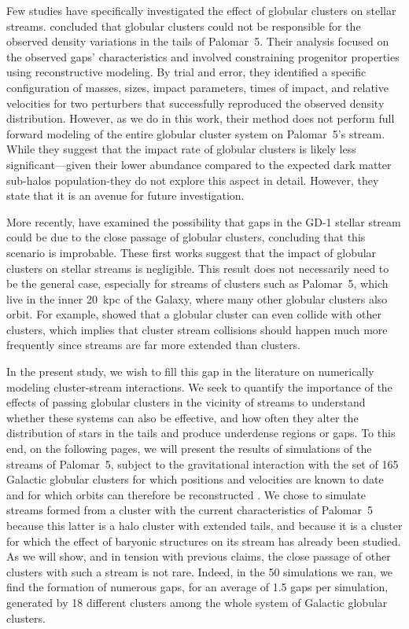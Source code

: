 \documentclass{aa}
\begin{document}
  Few studies have specifically investigated the effect of globular clusters on stellar streams. \citet{2017MNRAS.470...60E} concluded that globular clusters could not be responsible for the observed density variations in the tails of Palomar~5. Their analysis focused on the observed gaps' characteristics and involved constraining progenitor properties using reconstructive modeling. By trial and error, they identified a specific configuration of masses, sizes, impact parameters, times of impact, and relative velocities for two perturbers that successfully reproduced the observed density distribution. However, as we do in this work, their method does not perform full forward modeling of the entire globular cluster system on Palomar~5's stream. While they suggest that the impact rate of globular clusters is likely less significant—given their lower abundance compared to the expected dark matter sub-halos population-they do not explore this aspect in detail. However, they state that it is an avenue for future investigation. 
  
  More recently, \citet{2022ApJ...941..129D} have examined the possibility that gaps in the GD-1 stellar stream could be due to the close passage of globular clusters, concluding that this scenario is improbable. These first works suggest that the impact of globular clusters on stellar streams is negligible. This result does not necessarily need to be the general case, especially for streams of clusters such as Palomar~5, which live in the inner 20~kpc of the Galaxy, where many other globular clusters also orbit. For example, \citet{2023A&A...678A..69I} showed that a globular cluster can even collide with other clusters, which implies that cluster stream collisions should happen much more frequently since streams are far more extended than clusters. 
  
  In the present study, we wish to fill this gap in the literature on numerically modeling cluster-stream interactions. We seek to quantify the importance of the effects of passing globular clusters in the vicinity of streams to understand whether these systems can also be effective, and how often they alter the distribution of stars in the tails and produce underdense regions or gaps. To this end, on the following pages, we will present the results of simulations of the streams of Palomar~5, subject to the gravitational interaction with the set of 165 Galactic globular clusters for which positions and velocities are known to date and for which orbits can therefore be reconstructed \citep{2021MNRAS.505.5957B}. We chose to simulate streams formed from a cluster with the current characteristics of Palomar~5 because this latter is a halo cluster with extended tails, and because it is a cluster for which the effect of baryonic structures on its stream has already been studied. As we will show, and in tension with previous claims, the close passage of other clusters with such a stream is not rare. Indeed, in the 50 simulations we ran, we find the formation of numerous gaps, for an average of 1.5 gaps per simulation, generated by 18 different clusters among the whole system of Galactic globular clusters.
\end{document}
